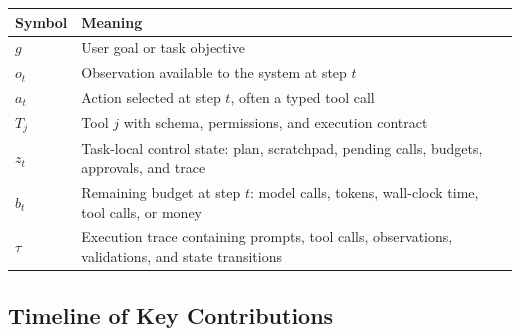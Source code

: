 \begin{center}
\begin{tabularx}{\textwidth}{@{}lX@{}}
\toprule
Symbol & Meaning \\
\midrule
$g$ & User goal or task objective \\
$o_t$ & Observation available to the system at step $t$ \\
$a_t$ & Action selected at step $t$, often a typed tool call \\
$T_j$ & Tool $j$ with schema, permissions, and execution contract \\
$z_t$ & Task-local control state: plan, scratchpad, pending calls, budgets, approvals, and trace \\
$b_t$ & Remaining budget at step $t$: model calls, tokens, wall-clock time, tool calls, or money \\
$\tau$ & Execution trace containing prompts, tool calls, observations, validations, and state transitions \\
\bottomrule
\end{tabularx}
\end{center}

\subsection*{Timeline of Key Contributions}

